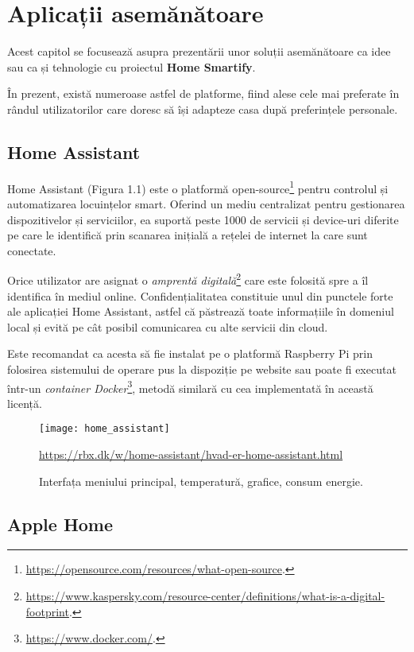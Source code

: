 \chapter{Aplicații asemănătoare}

Acest capitol se focusează asupra prezentării unor soluții asemănătoare ca idee sau ca și tehnologie cu proiectul \textbf{Home Smartify}. 

În prezent, există numeroase astfel de platforme, fiind alese cele mai preferate în rândul utilizatorilor care doresc să își adapteze casa după preferințele personale.

\section{Home Assistant}

Home Assistant (Figura 1.1) este o platformă open-source\footnote{\url{https://opensource.com/resources/what-open-source}.} pentru controlul și automatizarea locuințelor smart. Oferind un mediu centralizat pentru gestionarea dispozitivelor și serviciilor, ea suportă peste 1000 de servicii și device-uri diferite pe care le identifică prin scanarea inițială a rețelei de internet la care sunt conectate.

Orice utilizator are asignat o \emph{amprentă digitală}\footnote{\url{https://www.kaspersky.com/resource-center/definitions/what-is-a-digital-footprint}.} care este folosită spre a îl identifica în mediul online. Confidențialitatea constituie unul din punctele forte ale aplicației Home Assistant, astfel că păstrează toate informațiile în domeniul local și evită pe cât posibil comunicarea cu alte servicii din cloud.

Este recomandat ca acesta să fie instalat pe o platformă Raspberry Pi prin folosirea sistemului de operare pus la dispoziție pe website sau poate fi executat într-un \emph{container Docker}\footnote{\url{https://www.docker.com/}.}, metodă similară cu cea implementată în această licență.

\begin{figure}[h]
	\centering
	\texttt{[image: home\_assistant]}
	\caption{Interfața meniului principal, temperatură, grafice, consum energie.}\url{https://rbx.dk/w/home-assistant/hvad-er-home-assistant.html}
	\label{fig:home_assistant}
\end{figure}

\section{Apple Home}

